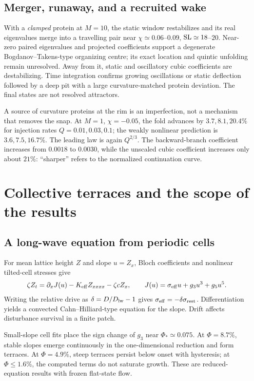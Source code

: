 \subsection{Merger, runaway, and a recruited wake}
With a \emph{clamped} protein at $M=10$, the static window restabilizes and its real eigenvalues merge into a travelling pair near $\chi\simeq0.06$--$0.09$, $\mathrm{SL}\simeq18$--$20$. Near-zero paired eigenvalues and projected coefficients support a degenerate Bogdanov--Takens-type organizing centre; its exact location and quintic unfolding remain unresolved. Away from it, static and oscillatory cubic coefficients are destabilizing. Time integration confirms growing oscillations or static deflection followed by a deep pit with a large curvature-matched protein deviation. The final states are not resolved attractors.

A source of curvature proteins at the rim is an imperfection, not a mechanism that removes the snap. At $M=1$, $\chi=-0.05$, the fold advances by $3.7,8.1,20.4\%$ for injection rates $Q=0.01,0.03,0.1$; the weakly nonlinear prediction is $3.6,7.5,16.7\%$. The leading law is again $Q^{2/3}$. The backward-branch coefficient increases from $0.0018$ to $0.0030$, while the unscaled cubic coefficient increases only about $21\%$: ``sharper'' refers to the normalized continuation curve.

\clearpage
\section{Collective terraces and the scope of the results}
\subsection{A long-wave equation from periodic cells}
For mean lattice height $Z$ and slope $u=Z_x$, Bloch coefficients and nonlinear tilted-cell stresses give
\begin{equation}
\zeta Z_t=\partial_xJ(u)-K_{\rm eff}Z_{xxxx}-\zeta cZ_x,\qquad
J(u)=\sigma_{\rm eff}u+g_3u^3+g_5u^5.\label{eq:lattice}
\end{equation}
Writing the relative drive as $\delta=D/D_{\rm lw}-1$ gives $\sigma_{\rm eff}=-\delta\sigma_{\rm rest}$. Differentiation yields a convected Cahn--Hilliard-type equation for the slope. Drift affects disturbance survival in a finite patch.

Small-slope cell fits place the sign change of $g_3$ near $\Phi_*\simeq0.075$. At $\Phi=8.7\%$, stable slopes emerge continuously in the one-dimensional reduction and form terraces. At $\Phi=4.9\%$, steep terraces persist below onset with hysteresis; at $\Phi\leq1.6\%$, the computed terms do not saturate growth. These are reduced-equation results with frozen flat-state flow.

